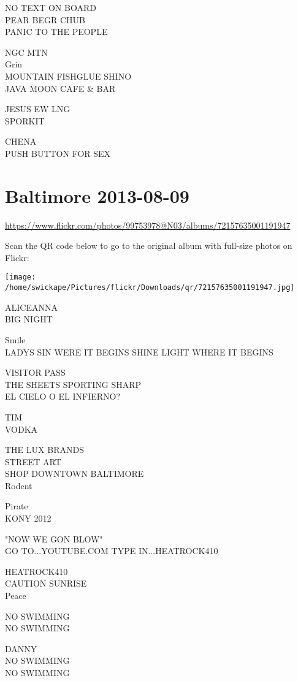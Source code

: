 \documentclass[10pt,letterpaper]{article}
\begin{document}
NO TEXT ON BOARD\\
PEAR BEGR CHUB\\
PANIC TO THE PEOPLE

NGC MTN\\
Grin\\
MOUNTAIN FISHGLUE SHINO\\
JAVA MOON CAFE \& BAR

JESUS EW LNG\\
SPORKIT

CHENA\\
PUSH BUTTON FOR SEX


\section*{Baltimore 2013-08-09}

\url{https://www.flickr.com/photos/99753978@N03/albums/72157635001191947}

Scan the QR code below to go to the original album with full-size photos on Flickr:

\texttt{[image: /home/swickape/Pictures/flickr/Downloads/qr/72157635001191947.jpg]}


ALICEANNA\\
BIG NIGHT

Smile\\
LADYS SIN WERE IT BEGINS SHINE LIGHT WHERE IT BEGINS

VISITOR PASS\\
THE SHEETS SPORTING SHARP\\
EL CIELO O EL INFIERNO?

TIM\\
VODKA

THE LUX BRANDS\\
STREET ART\\
SHOP DOWNTOWN BALTIMORE\\
Rodent

Pirate\\
KONY 2012

"NOW WE GON BLOW"\\
GO TO...YOUTUBE.COM TYPE IN...HEATROCK410

HEATROCK410\\
CAUTION SUNRISE\\
Peace

NO SWIMMING\\
NO SWIMMING

DANNY\\
NO SWIMMING\\
NO SWIMMING
\end{document}
